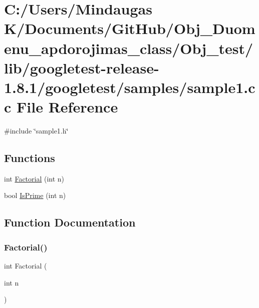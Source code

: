 \hypertarget{_obj__test_2lib_2googletest-release-1_88_81_2googletest_2samples_2sample1_8cc}{}\section{C\+:/\+Users/\+Mindaugas K/\+Documents/\+Git\+Hub/\+Obj\+\_\+\+Duomenu\+\_\+apdorojimas\+\_\+class/\+Obj\+\_\+test/lib/googletest-\/release-\/1.8.1/googletest/samples/sample1.cc File Reference}
\label{_obj__test_2lib_2googletest-release-1_88_81_2googletest_2samples_2sample1_8cc}
{\ttfamily \#include \char`\"{}sample1.\+h\char`\"{}}\newline
\subsection*{Functions}
\begin{DoxyCompactItemize}
\item 
int \mbox{\hyperlink{_obj__test_2lib_2googletest-release-1_88_81_2googletest_2samples_2sample1_8cc_a0e7da4d7a69c5b5afb707807aa177017}{Factorial}} (int n)
\item 
bool \mbox{\hyperlink{_obj__test_2lib_2googletest-release-1_88_81_2googletest_2samples_2sample1_8cc_a7093217f5edc11fe277d03bd064e5f11}{Is\+Prime}} (int n)
\end{DoxyCompactItemize}


\subsection{Function Documentation}
\mbox{\label{_obj__test_2lib_2googletest-release-1_88_81_2googletest_2samples_2sample1_8cc_a0e7da4d7a69c5b5afb707807aa177017}} 
\subsubsection{\texorpdfstring{Factorial()}{Factorial()}}
{\footnotesize\ttfamily int Factorial (\begin{DoxyParamCaption}\item[{int}]{n }\end{DoxyParamCaption})}

